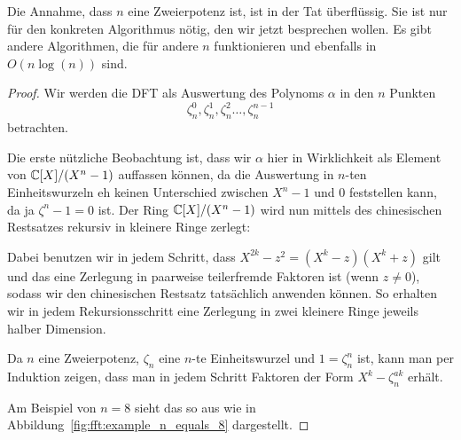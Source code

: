 \begin{remark}
    Die Annahme, dass $n$ eine Zweierpotenz ist, ist in der Tat überflüssig. Sie ist nur für den konkreten Algorithmus nötig, den wir jetzt besprechen wollen. Es gibt andere Algorithmen, die für andere $n$ funktionieren und ebenfalls in $O(n\log(n))$ sind.
\end{remark}
\begin{proof}
    Wir werden die DFT als Auswertung des Polynoms $\alpha$ in den $n$ Punkten
    \[\zeta_n^0, \zeta_n^1,\zeta_n^2 \ldots, \zeta_n^{n-1}\]
    betrachten.

    \smallskip
    Die erste nützliche Beobachtung ist, dass wir $\alpha$ hier in Wirklichkeit als Element von $\mathbb{C}[X]/(X^n-1)$ auffassen können, da die Auswertung in $n$-ten Einheitswurzeln eh keinen Unterschied zwischen $X^n-1$ und $0$ feststellen kann, da ja $\zeta^n-1=0$ ist. Der Ring $\mathbb{C}[X]/(X^n-1)$ wird nun mittels des chinesischen Restsatzes rekursiv in kleinere Ringe zerlegt:

    Dabei benutzen wir in jedem Schritt, dass $X^{2k}-z^2 = (X^k-z)(X^k+z)$ gilt und das eine Zerlegung in paarweise teilerfremde Faktoren ist (wenn $z\neq 0$), sodass wir den chinesischen Restsatz tatsächlich anwenden können. So erhalten wir in jedem Rekursionsschritt eine Zerlegung in zwei kleinere Ringe jeweils halber Dimension.

    Da $n$ eine Zweierpotenz, $\zeta_n$ eine $n$-te Einheitswurzel und $1=\zeta_n^n$ ist, kann man per Induktion zeigen, dass man in jedem Schritt Faktoren der Form $X^k-\zeta_n^{ak}$ erhält.

    \medskip
    Am Beispiel von $n=8$ sieht das so aus wie in Abbildung~\ref{fig:fft:example_n_equals_8} dargestellt.


\end{proof}
